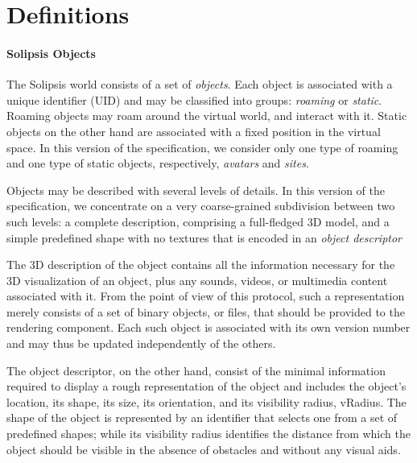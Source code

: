 \section{Definitions}

\paragraph{Solipsis Objects}
The Solipsis world consists of a set of \emph{objects}. Each object is
associated with a unique identifier (UID) and may be classified into
groups: \emph{roaming} or \emph{static}. Roaming objects may roam
around the virtual world, and interact with it. Static objects on the
other hand are associated with a fixed position in the virtual
space. In this version of the specification, we consider only one type
of roaming and one type of static objects, respectively,
\emph{avatars} and \emph{sites}.

Objects may be described with several levels of details. In this
version of the specification, we concentrate on a very coarse-grained
subdivision between two such levels: a complete description,
comprising a full-fledged 3D model, and a simple predefined shape with
no textures that is encoded in an \emph{object descriptor}

The 3D description of the object contains all the information
necessary for the 3D visualization of an object, plus any sounds,
videos, or multimedia content associated with it. From the point of
view of this protocol, such a representation merely consists of a set
of binary objects, or files, that should be provided to the rendering
component. Each such object is associated with its own version number
and may thus be updated independently of the others.

The object descriptor, on the other hand, consist of the minimal
information required to display a rough representation of the object
and includes the object's location, its shape, its size, its
orientation, and its visibility radius, vRadius. The shape of the object is
represented by an identifier that selects one from a set of predefined
shapes; while its visibility radius identifies the distance from which
the object should be visible in the absence of obstacles and without
any visual aids. 


